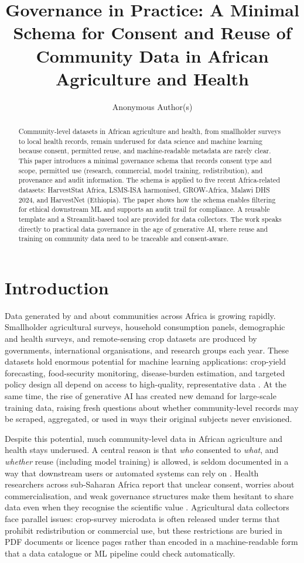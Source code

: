 \documentclass{article}
\title{Governance in Practice: A Minimal Schema for Consent and Reuse of Community Data in African Agriculture and Health}
\author{
Anonymous Author(s)
}
\begin{document}
\maketitle

\begin{abstract}
Community-level datasets in African agriculture and health, from smallholder surveys to local health records, remain underused for data science and machine learning because consent, permitted reuse, and machine-readable metadata are rarely clear. This paper introduces a minimal governance schema that records consent type and scope, permitted use (research, commercial, model training, redistribution), and provenance and audit information. The schema is applied to five recent Africa-related datasets: HarvestStat Africa, LSMS-ISA harmonised, GROW-Africa, Malawi DHS 2024, and HarvestNet (Ethiopia). The paper shows how the schema enables filtering for ethical downstream ML and supports an audit trail for compliance. A reusable template and a Streamlit-based tool are provided for data collectors. The work speaks directly to practical data governance in the age of generative AI, where reuse and training on community data need to be traceable and consent-aware.
\end{abstract}

\section{Introduction}

Data generated by and about communities across Africa is growing rapidly. Smallholder agricultural surveys, household consumption panels, demographic and health surveys, and remote-sensing crop datasets are produced by governments, international organisations, and research groups each year. These datasets hold enormous potential for machine learning applications: crop-yield forecasting, food-security monitoring, disease-burden estimation, and targeted policy design all depend on access to high-quality, representative data \cite{desbureaux2025,gourlay2025,jain2025}. At the same time, the rise of generative AI has created new demand for large-scale training data, raising fresh questions about whether community-level records may be scraped, aggregated, or used in ways their original subjects never envisioned.

Despite this potential, much community-level data in African agriculture and health stays underused. A central reason is that \emph{who} consented to \emph{what}, and \emph{whether} reuse (including model training) is allowed, is seldom documented in a way that downstream users or automated systems can rely on \cite{brown2024,chabilall2024}. Health researchers across sub-Saharan Africa report that unclear consent, worries about commercialisation, and weak governance structures make them hesitant to share data even when they recognise the scientific value \cite{chabilall2024}. Agricultural data collectors face parallel issues: crop-survey microdata is often released under terms that prohibit redistribution or commercial use, but these restrictions are buried in PDF documents or licence pages rather than encoded in a machine-readable form that a data catalogue or ML pipeline could check automatically.
\end{document}

